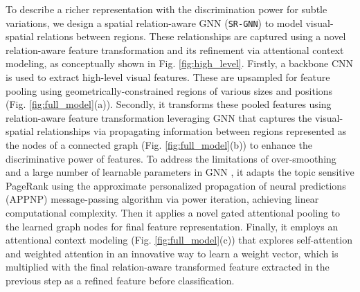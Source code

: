 \documentclass[journal]{IEEEtran}
\begin{document}
To describe a richer representation with the discrimination power for subtle variations, we design a spatial relation-aware GNN 
(\texttt{SR-GNN}) to model visual-spatial relations between regions. These relationships are captured using a novel relation-aware feature transformation and its refinement via attentional context modeling, as conceptually shown in Fig. \ref{fig:high_level}. Firstly, a backbone CNN is used to extract high-level visual features. These are upsampled for feature pooling using geometrically-constrained regions of various sizes and positions  (Fig. \ref{fig:full_model}(a)). Secondly, it transforms these pooled features using relation-aware feature transformation leveraging GNN that captures the visual-spatial relationships via propagating information between regions represented as the nodes of a connected graph (Fig. \ref{fig:full_model}(b)) to enhance the discriminative power of features. To address the limitations of over-smoothing and a large number of learnable parameters in GNN \cite{kipf2016semi}, it adapts the topic sensitive PageRank \cite{klicpera2018predict} using the approximate personalized propagation of neural predictions (APPNP) message-passing algorithm via power iteration, achieving linear computational complexity. Then it applies a novel gated attentional pooling to the learned graph nodes for final feature representation. Finally, it employs an attentional context modeling (Fig. \ref{fig:full_model}(c)) that explores self-attention \cite{vaswani2017attention} and weighted attention \cite{BahdanauCB14} in an innovative way to learn a weight vector, which is multiplied with the final relation-aware transformed feature extracted in the previous step as a refined feature before classification. 
\end{document}
